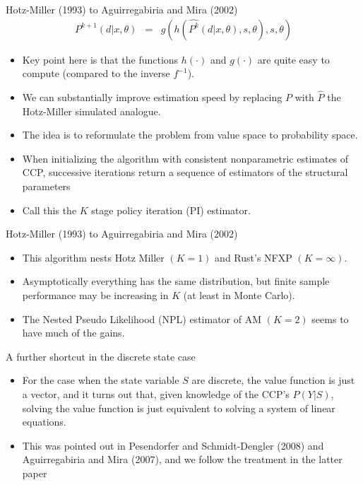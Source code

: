 \documentclass[aspectratio=169,11pt]{beamer}
\begin{document}
\begin{frame}{Hotz-Miller (1993) to Aguirregabiria and Mira (2002)}
\begin{eqnarray*}
P^{k+1}(d | x,\theta) &=& g(h(\hat{P^{k}}(d | x, \theta),s ,\theta),s,\theta)
\end{eqnarray*}
\vspace{-0.5cm}
\begin{itemize}
\item Key point here is that the functions $h(\cdot)$ and $g(\cdot)$ are quite easy to compute (compared to the inverse $f^{-1}$).
\item We can substantially improve estimation speed by replacing $P$ with $\hat{P}$ the Hotz-Miller simulated analogue.
\item The idea is to reformulate the problem from \alert{value space} to \alert{probability space}.
\item When initializing the algorithm with consistent nonparametric estimates of CCP, successive iterations return a sequence of estimators of the structural parameters
\item Call this the $K$ stage policy iteration (PI) estimator.
\end{itemize}
\end{frame}

\begin{frame}{Hotz-Miller (1993) to Aguirregabiria and Mira (2002)}
\begin{itemize}
\item This algorithm nests Hotz Miller $(K=1)$ and Rust's NFXP $(K=\infty)$.
\item Asymptotically everything has the same distribution, but finite sample performance may be increasing in $K$ (at least in Monte Carlo).
\item The Nested Pseudo Likelihood (NPL) estimator of AM $(K=2)$ seems to have much of the gains.
\end{itemize}
\end{frame}




\begin{frame}{A further shortcut in the discrete state case}
\begin{itemize}
\item For the case when the state variable $S$ are discrete, the value function is just a vector, and it turns out that, given knowledge of the CCP's $P(Y|S)$, solving the value function is just equivalent  to solving a system of linear equations.
\item  This was pointed out in Pesendorfer and Schmidt-Dengler (2008) and Aguirregabiria and Mira (2007), and we follow the treatment in the latter paper
\end{itemize}
\end{frame}
\end{document}
